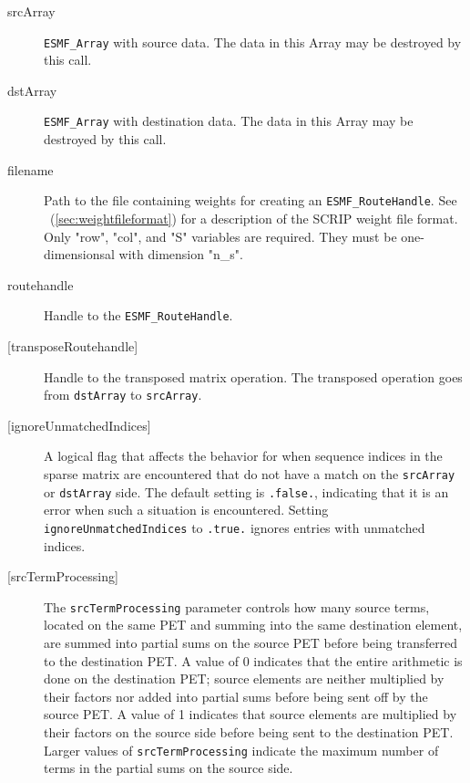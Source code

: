    \begin{description}
  
   \item [srcArray]
       {\tt ESMF\_Array} with source data. The data in this Array may be
       destroyed by this call.
  
   \item [dstArray]
         {\tt ESMF\_Array} with destination data. The data in this Array may be
         destroyed by this call.
  
   \item [filename]
         Path to the file containing weights for creating an {\tt ESMF\_RouteHandle}.
         See ~(\ref{sec:weightfileformat}) for a description of the SCRIP weight
         file format. Only "row", "col", and "S" variables are required. They
         must be one-dimensionsal with dimension "n\_s".
  
   \item [routehandle]
         Handle to the {\tt ESMF\_RouteHandle}.
  
     \item [{[transposeRoutehandle]}]
       Handle to the transposed matrix operation. The transposed operation goes
       from {\tt dstArray} to {\tt srcArray}.
  
     \item [{[ignoreUnmatchedIndices]}]
       A logical flag that affects the behavior for when sequence indices
       in the sparse matrix are encountered that do not have a match on the
       {\tt srcArray} or {\tt dstArray} side. The default setting is
       {\tt .false.}, indicating that it is an error when such a situation is
       encountered. Setting {\tt ignoreUnmatchedIndices} to {\tt .true.} ignores
       entries with unmatched indices.
  
     \item [{[srcTermProcessing]}]
       The {\tt srcTermProcessing} parameter controls how many source terms,
       located on the same PET and summing into the same destination element,
       are summed into partial sums on the source PET before being transferred
       to the destination PET. A value of 0 indicates that the entire arithmetic
       is done on the destination PET; source elements are neither multiplied
       by their factors nor added into partial sums before being sent off by the
       source PET. A value of 1 indicates that source elements are multiplied
       by their factors on the source side before being sent to the destination
       PET. Larger values of {\tt srcTermProcessing} indicate the maximum number
       of terms in the partial sums on the source side.
  

\end{description}
